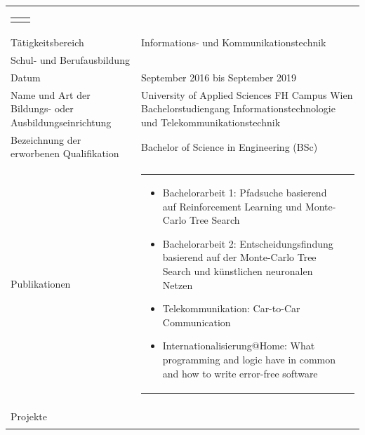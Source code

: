 \begin{longtable}{p{}|p{}}
\begin{tabular} {m{} m{} }
\begin{itemize}[nosep,leftmargin=1em]
	\end{itemize}
	\end{tabular}
	\\
	Tätigkeitsbereich & Informations- und Kommunikationstechnik \\ \bottomrule
	\large{Schul- und Berufausbildung} & \\
    Datum & September 2016 bis September 2019 \\
    Name und Art der Bildungs- oder Ausbildungseinrichtung & University of Applied Sciences FH Campus Wien \newline
    Bachelorstudiengang Informationstechnologie und Telekommunikationstechnik \\
    Bezeichnung der erworbenen Qualifikation & Bachelor of Science in Engineering (BSc) \\
    Publikationen &
    \begin{tabular} {m{} m{} }
    \begin{itemize}[nosep,leftmargin=1em]
	\item Bachelorarbeit 1: Pfadsuche basierend auf Reinforcement Learning und Monte-Carlo Tree Search
	\item Bachelorarbeit 2: Entscheidungsfindung basierend auf der Monte-Carlo Tree Search und künstlichen neuronalen Netzen
    \item Telekommunikation: Car-to-Car Communication
	\item Internationalisierung@Home: What programming and logic have in common and how to write error-free software
	\end{itemize}
	\end{tabular}
	\\
	Projekte & %
	\begin{tabular}{m{} m{} }

\end{tabular}
\end{longtable}

